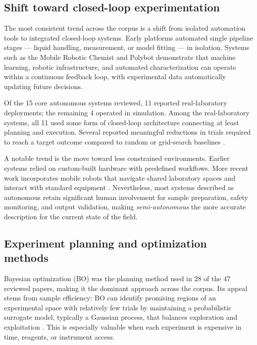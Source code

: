 \documentclass{article}
\begin{document}
\subsection{Shift toward closed-loop experimentation}
\label{sec:results:closedloop}

The most consistent trend across the corpus is a shift from isolated automation tools to integrated closed-loop systems. Early platforms automated single pipeline stages — liquid handling, measurement, or model fitting — in isolation. Systems such as the Mobile Robotic Chemist \cite{burger2020mobile} and Polybot \cite{gomes2021polybot} demonstrate that machine learning, robotic infrastructure, and automated characterization can operate within a continuous feedback loop, with experimental data automatically updating future decisions.

Of the 15 core autonomous systems reviewed, 11 reported real-laboratory deployments; the remaining 4 operated in simulation. Among the real-laboratory systems, all 11 used some form of closed-loop architecture connecting at least planning and execution. Several reported meaningful reductions in trials required to reach a target outcome compared to random or grid-search baselines \cite{macleod2020self, burger2020mobile}.

A notable trend is the move toward less constrained environments. Earlier systems relied on custom-built hardware with predefined workflows. More recent work incorporates mobile robots that navigate shared laboratory spaces and interact with standard equipment \cite{burger2020mobile, rozo2020learning}. Nevertheless, most systems described as autonomous retain significant human involvement for sample preparation, safety monitoring, and output validation, making \textit{semi-autonomous} the more accurate description for the current state of the field.

\subsection{Experiment planning and optimization methods}

Bayesian optimization (BO) was the planning method used in 28 of the 47 reviewed papers, making it the dominant approach across the corpus. Its appeal stems from sample efficiency: BO can identify promising regions of an experimental space with relatively few trials by maintaining a probabilistic surrogate model, typically a Gaussian process, that balances exploration and exploitation \cite{pyzer2018bayesian, shahriari2016taking}. This is especially valuable when each experiment is expensive in time, reagents, or instrument access.
\end{document}
